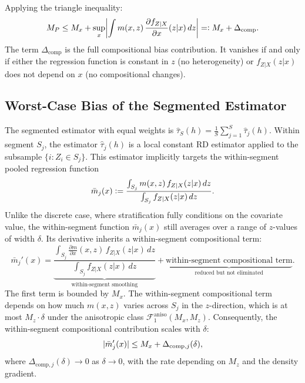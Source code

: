 Applying the triangle inequality:
\begin{equation}\label{eq:MP_bound}
	M_P \leq M_x + \sup_x \abs*{\int m(x,z)\, \frac{\partial f_{Z|X}}{\partial x}(z|x)\, dz} \eqdef M_x + \Delta_{\mathrm{comp}}.
\end{equation}
The term $\Delta_{\mathrm{comp}}$ is the full compositional bias contribution.
It vanishes if and only if either the regression function is constant in $z$ (no heterogeneity) or $f_{Z|X}(z|x)$ does not depend on $x$ (no compositional changes).


\subsection{Worst-Case Bias of the Segmented Estimator}\label{sec:bias:segmented}

The segmented estimator with equal weights is $\hat{\tau}_S(h) = \frac{1}{S} \sum_{j=1}^{S} \hat{\tau}_j(h)$.
Within segment $S_j$, the estimator $\hat{\tau}_j(h)$ is a local constant RD estimator applied to the subsample $\{i : Z_i \in S_j\}$.
This estimator implicitly targets the within-segment pooled regression function
\begin{equation}\label{eq:m_j}
	\bar{m}_j(x) \vcentcolon= \frac{\int_{S_j} m(x,z)\, f_{Z|X}(z|x)\, dz}{\int_{S_j} f_{Z|X}(z|x)\, dz}.
\end{equation}
Unlike the discrete case, where stratification fully conditions on the covariate value, the within-segment function $\bar{m}_j(x)$ still averages over a range of $z$-values of width $\delta$.
Its derivative inherits a within-segment compositional term:
\begin{equation}\label{eq:m_j_deriv}
	\bar{m}_j'(x) = \underbrace{\frac{\int_{S_j} \frac{\partial m}{\partial x}(x,z)\, f_{Z|X}(z|x)\, dz}{\int_{S_j} f_{Z|X}(z|x)\, dz}}_{\text{within-segment smoothing}} + \underbrace{\text{within-segment compositional term}}_{\text{reduced but not eliminated}}.
\end{equation}
The first term is bounded by $M_x$.
The within-segment compositional term depends on how much $m(x,z)$ varies across $S_j$ in the $z$-direction, which is at most $M_z \cdot \delta$ under the anisotropic class $\mathcal{F}_1^{\mathrm{aniso}}(M_x, M_z)$.
Consequently, the within-segment compositional contribution scales with $\delta$:
\begin{equation}\label{eq:delta_comp_j}
	\lvert\bar{m}_j'(x)\rvert \leq M_x + \Delta_{\mathrm{comp},j}(\delta),
\end{equation}
where $\Delta_{\mathrm{comp},j}(\delta) \to 0$ as $\delta \to 0$, with the rate depending on $M_z$ and the density gradient.


